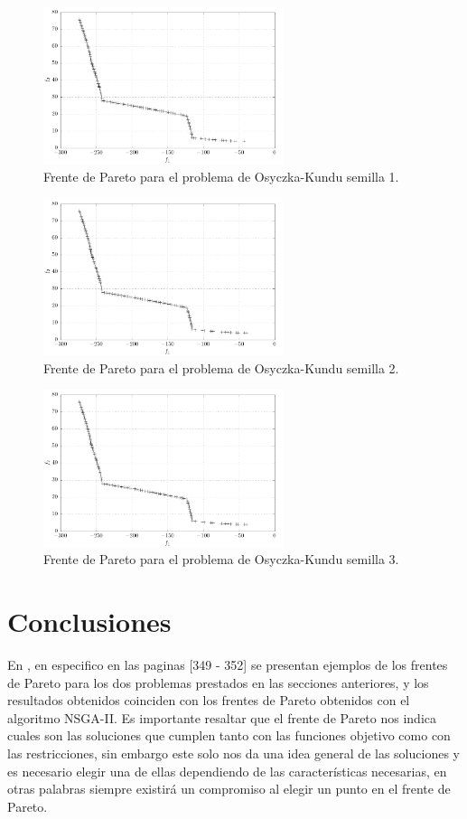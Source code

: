 \documentclass[conference]{IEEEtran}
\begin{document}
\begin{figure}[hbtp]
\centering
\includegraphics[width=7cm]{osy1.pdf}
\caption{Frente de Pareto para el problema de Osyczka-Kundu semilla 1.}
\label{fig:osy1}
\end{figure}

\begin{figure}[hbtp]
\centering
\includegraphics[width=7cm]{osy2.pdf}
\caption{Frente de Pareto para el problema de Osyczka-Kundu semilla 2.}
\label{fig:osy2}
\end{figure}

\begin{figure}[hbtp]
\centering
\includegraphics[width=7cm]{osy2.pdf}
\caption{Frente de Pareto para el problema de Osyczka-Kundu semilla 3.}
\label{fig:osy3}
\end{figure}

\section{Conclusiones}

En \cite{b2}, en especifico en las paginas [349 - 352] se presentan ejemplos de los frentes de Pareto para los dos problemas prestados en las secciones anteriores, y los resultados obtenidos coinciden con los frentes de Pareto obtenidos con el algoritmo NSGA-II. Es importante resaltar que el frente de Pareto nos indica cuales son las soluciones que cumplen tanto con las funciones objetivo como con las restricciones, sin embargo este solo nos da una idea general de las soluciones y es necesario elegir una de ellas dependiendo de las características necesarias, en otras palabras siempre existirá un compromiso al elegir un punto en el frente de Pareto.
\end{document}

